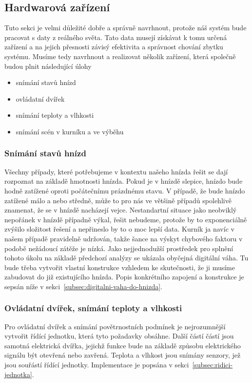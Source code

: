 \subsection{Hardwarová zařízení}\label{subsec:hardwarova-zarizeni}
Tuto sekci je velmi důležité dobře a správně navrhnout, protože náš systém bude pracovat s daty z reálného světa.
Tato data musejí získávat k tomu určená zařízení a na jejich přesnosti závisý efektivita a správnost chování zbytku systému.
Musíme tedy navrhnout a realizovat několik zařízení, která společně budou plnit následující úlohy
\begin{itemize}
    \item snímání stavů hnízd
    \item ovládatní dvířek
    \item snímání teploty a vlhkosti
    \item snímání scén v kurníku a ve výběhu
\end{itemize}
\subsubsection{Snímání stavů hnízd}
Všechny případy, které potřebujeme v kontextu našeho hnízda řešit se dají rozpoznat na základě hmotnosti hnízda.
Pokud je v hnízdě slepice, hnízdo bude hodně zatížené oproti počátečnímu prázdnému stavu.
V případě, že bude hnízdo zatížené málo a nebo středně, může to pro nás ve většině případů spolehlivě znamenat, že se v hnízdě nacházejí vejce.
Nestandartní situace jako neobviklý nepořánek v hnízdě případně výkal, řešit nebudeme, protože by to exponenciálně zvýšilo složitost řešení a nepřineslo by to o moc lepší data.
Kurník ja navíc v našem případě pravidelně udržován, takže šance na výskyt chybového faktoru v podobě nežádoucí zátěže je nízká.
Jako nejjednodužší prostředek pro splnění tohoto úkolu na základě předchozí analýzy se ukázala obyčejná digitální váha.
Tu bude třeba vytvořit vlastní konstrukce vzhledem ke skutečnosti, že ji musíme zabudovat do již existujícího hnízda.
Popis konkrétního zapojení a konstrukce je sepsán níže v sekci~\ref{subsec:digitalni-vaha-do-hnizda}.

\subsubsection{Ovládatní dvířek, snímání teploty a vlhkosti}
Pro ovládatní dvířek a snímání povětrnostních podmínek je nejrozumnější vytvořit řídící jednotku, která tyto požadavky obsáhne.
Další částí částí jsou samotná elektrická dvířka, jejichž funkce bude na základě způsobu elektrického signálu být otevřená nebo zavřená.
Teplota a vlhkost jsou snímány senzory, jež jsou souřástí řídící jednotky.
Implementace je popsána v sekci~\ref{subsec:ridici-jednotka}.
